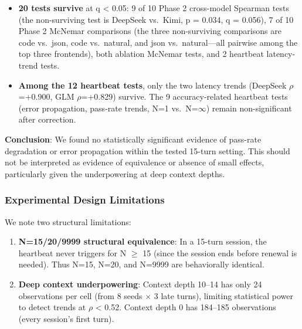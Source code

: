 \documentclass{article}
\begin{document}
\begin{itemize}



\item

  \textbf{20 tests survive} at q < 0.05: 9 of 10 Phase 2 cross-model Spearman tests (the non-surviving test is DeepSeek vs.~Kimi, p = 0.034, q = 0.056), 7 of 10 Phase 2 McNemar comparisons (the three non-surviving comparisons are code vs.~json, code vs.~natural, and json vs.~natural---all pairwise among the top three frontends), both ablation McNemar tests, and 2 heartbeat latency-trend tests.

\item

  \textbf{Among the 12 heartbeat tests}, only the two latency trends (DeepSeek $\rho$=+0.900, GLM $\rho$=+0.829) survive. The 9 accuracy-related heartbeat tests (error propagation, pass-rate trends, N=1 vs.~N=$\infty$) remain non-significant after correction.

\end{itemize}



\textbf{Conclusion}: We found no statistically significant evidence of pass-rate degradation or error propagation within the tested 15-turn setting. This should not be interpreted as evidence of equivalence or absence of small effects, particularly given the underpowering at deep context depths.



\subsubsection{Experimental Design Limitations}\label{experimental-design-limitations}



We note two structural limitations:



\begin{enumerate}


\item

  \textbf{N=15/20/9999 structural equivalence}: In a 15-turn session, the heartbeat never triggers for N $\geq$ 15 (since the session ends before renewal is needed). Thus N=15, N=20, and N=9999 are behaviorally identical.

\item

  \textbf{Deep context underpowering}: Context depth 10--14 has only 24 observations per cell (from 8 seeds $\times$ 3 late turns), limiting statistical power to detect trends at \textbar $\rho$\textbar{} < 0.52. Context depth 0 has 184--185 observations (every session's first turn).

\end{enumerate}
\end{document}
